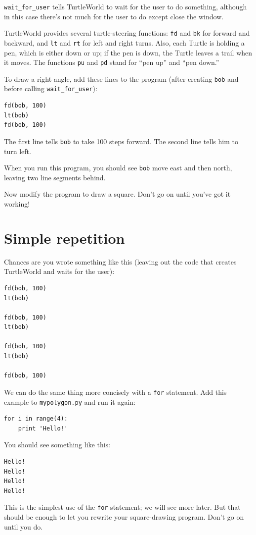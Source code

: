 \documentclass[10pt]{book}
\begin{document}
\verb"wait_for_user" tells TurtleWorld to wait for the user
to do something, although in this case there's not much for
the user to do except close the window.

TurtleWorld provides several
turtle-steering functions: {\tt fd} and {\tt bk} for
forward and backward, and {\tt lt} and {\tt rt} for left and
right turns.  Also, each Turtle is holding a pen, which is
either down or up; if the pen is down, the Turtle leaves
a trail when it moves.  The functions {\tt pu} and {\tt pd}
stand for ``pen up'' and ``pen down.''

To draw a right angle, add these lines to the program
(after creating {\tt bob} and before calling \verb"wait_for_user"):

\begin{verbatim}
fd(bob, 100)
lt(bob)
fd(bob, 100)
\end{verbatim}
%
The first line tells {\tt bob} to take 100 steps
forward.  The second line tells him to turn left.

When you run this program, you should see {\tt bob} move east and then
north, leaving two line segments behind.

Now modify the program to draw a square.  Don't go on until
you've got it working!


\section{Simple repetition}
\label{repetition}

Chances are you wrote something like this (leaving out the code
that creates TurtleWorld and waits for the user):

\begin{verbatim}
fd(bob, 100)
lt(bob)

fd(bob, 100)
lt(bob)

fd(bob, 100)
lt(bob)

fd(bob, 100)
\end{verbatim}
%
We can do the same thing more concisely with a {\tt for} statement.
Add this example to {\tt mypolygon.py} and run it again:

\begin{verbatim}
for i in range(4):
    print 'Hello!'
\end{verbatim}
%
You should see something like this:

\begin{verbatim}
Hello!
Hello!
Hello!
Hello!
\end{verbatim}
%
This is the simplest use of the {\tt for} statement; we will see
more later.  But that should be enough to let you rewrite your
square-drawing program.  Don't go on until you do.
\end{document}
